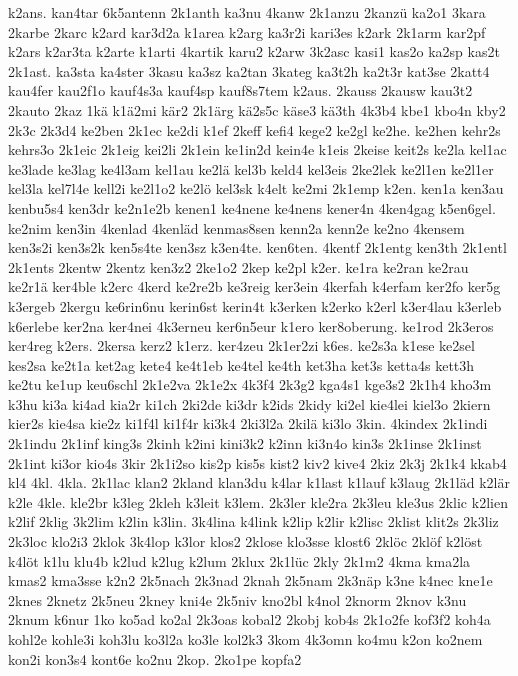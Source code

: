 {k2ans.
kan4tar
6k5antenn
2k1anth
ka3nu
4kanw
2k1anzu
2kanzü
ka2o1
3kara
2karbe
2karc
k2ard
kar3d2a
k1area
k2arg
ka3r2i
kari3es
k2ark
2k1arm
kar2pf
k2ars
k2ar3ta
k2arte
k1arti
4kartik
karu2
k2arw
3k2asc
kasi1
kas2o
ka2sp
kas2t
2k1ast.
ka3sta
ka4ster
3kasu
ka3sz
ka2tan
3kateg
ka3t2h
ka2t3r
kat3se
2katt4
kau4fer
kau2f1o
kauf4s3a
kauf4sp
kauf8s7tem
k2aus.
2kauss
2kausw
kau3t2
2kauto
2kaz
1kä
k1ä2mi
kär2
2k1ärg
kä2s5c
käse3
kä3th
4k3b4
kbe1
kbo4n
kby2
2k3c
2k3d4
ke2ben
2k1ec
ke2di
k1ef
2keff
kefi4
kege2
ke2gl
ke2he.
ke2hen
kehr2s
kehrs3o
2k1eic
2k1eig
kei2li
2k1ein
ke1in2d
kein4e
k1eis
2keise
keit2s
ke2la
kel1ac
ke3lade
ke3lag
ke4l3am
kel1au
ke2lä
kel3b
keld4
kel3eis
2ke2lek
ke2l1en
ke2l1er
kel3la
kel7l4e
kell2i
ke2l1o2
ke2lö
kel3sk
k4elt
ke2mi
2k1emp
k2en.
ken1a
ken3au
kenbu5s4
ken3dr
ke2n1e2b
kenen1
ke4nene
ke4nens
kener4n
4ken4gag
k5en6gel.
ke2nim
ken3in
4kenlad
4kenläd
kenmas8sen
kenn2a
kenn2e
ke2no
4kensem
ken3s2i
ken3s2k
ken5s4te
ken3sz
k3en4te.
ken6ten.
4kentf
2k1entg
ken3th
2k1entl
2k1ents
2kentw
2kentz
ken3z2
2ke1o2
2kep
ke2pl
k2er.
ke1ra
ke2ran
ke2rau
ke2r1ä
ker4ble
k2erc
4kerd
ke2re2b
ke3reig
ker3ein
4kerfah
k4erfam
ker2fo
ker5g
k3ergeb
2kergu
ke6rin6nu
kerin6st
kerin4t
k3erken
k2erko
k2erl
k3er4lau
k3erleb
k6erlebe
ker2na
ker4nei
4k3erneu
ker6n5eur
k1ero
ker8oberung.
ke1rod
2k3eros
ker4reg
k2ers.
2kersa
kerz2
k1erz.
ker4zeu
2k1er2zi
k6es.
ke2s3a
k1ese
ke2sel
kes2sa
ke2t1a
ket2ag
kete4
ke4t1eb
ke4tel
ke4th
ket3ha
ket3s
ketta4s
kett3h
ke2tu
ke1up
keu6schl
2k1e2va
2k1e2x
4k3f4
2k3g2
kga4s1
kge3s2
2k1h4
kho3m
k3hu
ki3a
ki4ad
kia2r
ki1ch
2ki2de
ki3dr
k2ids
2kidy
ki2el
kie4lei
kiel3o
2kiern
kier2s
kie4sa
kie2z
ki1f4l
ki1f4r
ki3k4
2ki3l2a
2kilä
ki3lo
3kin.
4kindex
2k1indi
2k1indu
2k1inf
king3s
2kinh
k2ini
kini3k2
k2inn
ki3n4o
kin3s
2k1inse
2k1inst
2k1int
ki3or
kio4s
3kir
2k1i2so
kis2p
kis5s
kist2
kiv2
kive4
2kiz
2k3j
2k1k4
kkab4
kl4
4kl.
4kla.
2k1lac
klan2
2kland
klan3du
k4lar
k1last
k1lauf
k3laug
2k1läd
k2lär
k2le
4kle.
kle2br
k3leg
2kleh
k3leit
k3lem.
2k3ler
kle2ra
2k3leu
kle3us
2klic
k2lien
k2lif
2klig
3k2lim
k2lin
k3lin.
3k4lina
k4link
k2lip
k2lir
k2lisc
2klist
klit2s
2k3liz
2k3loc
klo2i3
2klok
3k4lop
k3lor
klos2
2klose
klo3sse
klost6
2klöc
2klöf
k2löst
k4löt
k1lu
klu4b
k2lud
k2lug
k2lum
2klux
2k1lüc
2kly
2k1m2
4kma
kma2la
kmas2
kma3sse
k2n2
2k5nach
2k3nad
2knah
2k5nam
2k3näp
k3ne
k4nec
kne1e
2knes
2knetz
2k5neu
2kney
kni4e
2k5niv
kno2bl
k4nol
2knorm
2knov
k3nu
2knum
k6nur
1ko
ko5ad
ko2al
2k3oas
kobal2
2kobj
kob4s
2k1o2fe
kof3f2
koh4a
kohl2e
kohle3i
koh3lu
ko3l2a
ko3le
kol2k3
3kom
4k3omn
ko4mu
k2on
ko2nem
kon2i
kon3s4
kont6e
ko2nu
2kop.
2ko1pe
kopfa2
}
